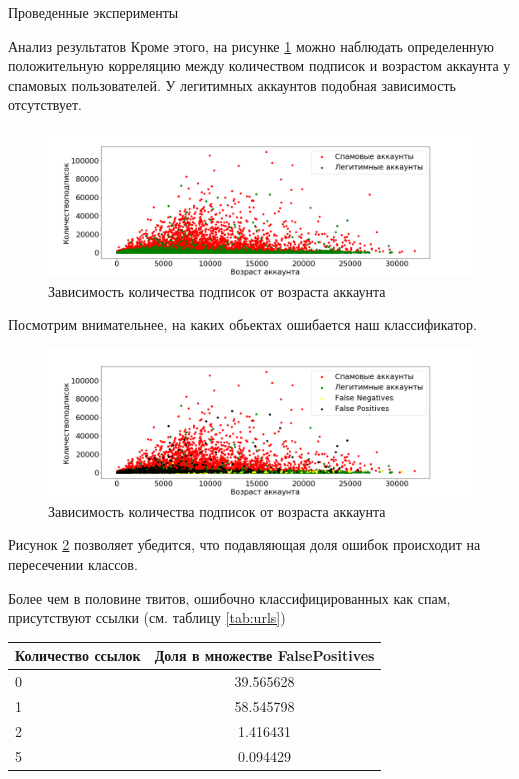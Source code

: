 \begin{section}{Проведенные эксперименты}
\begin{subsection}{Анализ результатов}
Кроме этого, на рисунке \ref{pic:ageincrease} можно наблюдать определенную положительную корреляцию между количеством подписок и возрастом аккаунта у спамовых пользователей. У легитимных аккаунтов подобная зависимость отсутствует.

\begin{figure}[ht!]
\centering
\includegraphics[width=1.0\textwidth]{pics/ageincrease.png}
\caption{Зависимость количества подписок от возраста аккаунта}
\label{pic:ageincrease}
\end{figure}


Посмотрим внимательнее, на каких обьектах ошибается наш классификатор.

\begin{figure}[ht!]
\centering
\includegraphics[width=1.0\textwidth]{pics/ageincreasewitherrors.png}
\caption{Зависимость количества подписок от возраста аккаунта}
\label{pic:ageincreasewithwerrors}
\end{figure}

Рисунок \ref{pic:ageincreasewithwerrors} позволяет убедится, что подавляющая доля ошибок происходит на пересечении классов.

Более чем в половине твитов, ошибочно классифицированных как спам, присутствуют ссылки (см. таблицу \ref{tab:urls})



\begin{table}[H]
\centering
{\begin{tabular}{|l|c|}
\hline
\textbf{Количество ссылок} & \textbf{Доля в множестве FalsePositives} \\
\hline
0 &   39.565628 \\
\hline
1  &  58.545798 \\
\hline
2  &   1.416431 \\
\hline
5  &  0.094429 \\
\hline
\end{tabular}}


\end{table}
\end{subsection}
\end{section}
